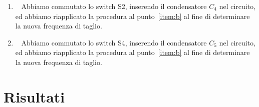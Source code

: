 \documentclass[a4paper]{article}
\begin{document}
\begin{enumerate}[label=\alph*.]
\begin{figure}[h!]
\begin{subfigure}{0.4\textwidth}
							\caption{Segnale con un offset di $ 180 \, \mathrm{mV} $.}
						\end{subfigure}
						\label{fig:punto2.4.3.d}
					\end{figure}
				\item \ 
					\newline
					Abbiamo commutato lo switch S2, inserendo il condensatore $ C_{4} $ nel circuito, ed abbiamo riapplicato la procedura al punto~\ref{item:b} al fine di determinare la nuova frequenza di taglio.
				\item \ 
					\newline
					Abbiamo commutato lo switch S4, inserendo il condensatore $ C_{5} $ nel circuito, ed abbiamo riapplicato la procedura al punto~\ref{item:b} al fine di determinare la nuova frequenza di taglio.
			\end{enumerate}
	\section{Risultati}
\end{document}
